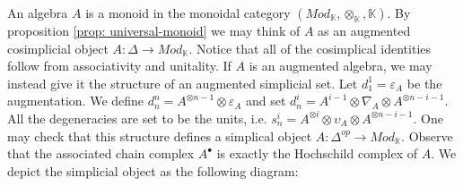 \documentclass[../thesis.tex]{subfiles}
\begin{document}

            An algebra $A$ is a monoid in the monoidal category $(Mod_\mathbb{K}, \otimes_\mathbb{K}, \mathbb{K})$. By proposition \ref{prop: universal-monoid} we may think of $A$ as an augmented cosimplicial object $A:\Delta \rightarrow Mod_\mathbb{K}$. Notice that all of the cosimplical identities follow from associativity and unitality. If $A$ is an augmented algebra, we may instead give it the structure of an augmented simplicial set. Let $d^1_1 = \varepsilon_A$ be the augmentation. We define $d^n_n = A^{\otimes n-1}\otimes\varepsilon_A$ and set $d^i_n = A^{i-1}\otimes \nabla_A \otimes A^{\otimes n-i-1}$. All the degeneracies are set to be the units, i.e. $s^i_n = A^{\otimes i}\otimes \upsilon_A \otimes A^{\otimes n-i-1}$. One may check that this structure defines a simplical object $A:\Delta^{op}\rightarrow Mod_\mathbb{K}$. Observe that the associated chain complex $A^\bullet$ is exactly the Hochschild complex of $A$. We depict the simplicial object as the following diagram:
            \begin{center}

            \end{center}
\end{document}
